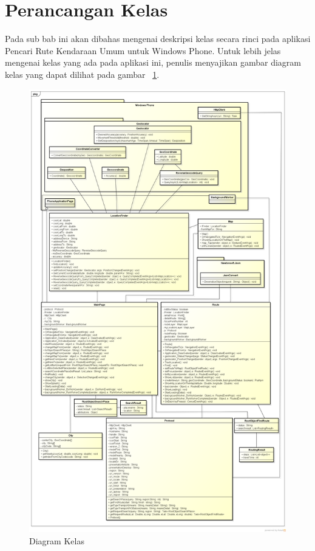 \section{Perancangan Kelas}
\label{lab:Perancangan Kelas}
\hspace{0.5cm} Pada sub bab ini akan dibahas mengenai deskripsi kelas secara rinci pada aplikasi Pencari Rute Kendaraan Umum untuk Windows Phone. Untuk lebih jelas mengenai kelas yang ada pada aplikasi ini, penulis menyajikan gambar diagram kelas yang dapat dilihat pada  gambar ~\ref{fig:kelas}. 

\begin{figure}[h]
	\centering
		\includegraphics[scale=0.3]{Gambar/useCase_dan_Class/class4}
	\caption{Diagram Kelas}
	\label{fig:kelas}
\end{figure}



